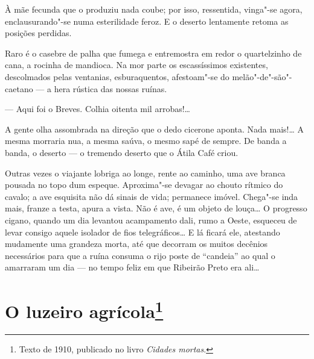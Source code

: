 À mãe fecunda que o produziu nada coube; por isso, ressentida, vinga"-se
agora, enclausurando"-se numa esterilidade feroz. E o deserto lentamente
retoma as posições perdidas.

Raro é o casebre de palha que fumega e entremostra em redor o
quartelzinho de cana, a rocinha de mandioca. Na mor parte os
escassíssimos existentes, descolmados pelas ventanias, esburaquentos,
afestoam"-se do melão"-de"-são"-caetano --- a hera rústica das nossas
ruínas.


--- Aqui foi o Breves. Colhia oitenta mil arrobas!\ldots{}

A gente olha assombrada na direção que o dedo cicerone aponta. Nada
mais!\ldots{} A mesma morraria nua, a mesma saúva, o mesmo sapé de sempre. De
banda a banda, o deserto --- o tremendo deserto que o Átila Café criou.

Outras vezes o viajante lobriga ao longe, rente ao caminho, uma ave
branca pousada no topo dum espeque. Aproxima"-se devagar ao chouto
rítmico do cavalo; a ave esquisita não dá sinais de vida; permanece
imóvel. Chega"-se inda mais, franze a testa, apura a vista. Não é ave, é
um objeto de louça\ldots{} O progresso cigano, quando um dia levantou
acampamento dali, rumo a Oeste, esqueceu de levar consigo aquele
isolador de fios telegráficos\ldots{} E lá ficará ele, atestando mudamente
uma grandeza morta, até que decorram os muitos decênios necessários para
que a ruína consuma o rijo poste de ``candeia'' ao qual o amarraram um
dia --- no tempo feliz em que Ribeirão Preto era ali\ldots{}

\chapter{O luzeiro agrícola\footnote[*]{Texto de 1910, publicado no livro \emph{Cidades mortas}.}}

